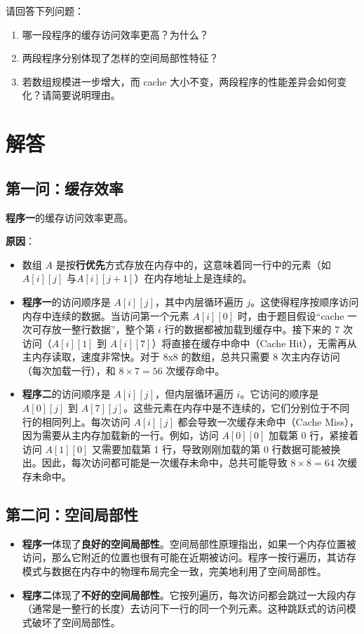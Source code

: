 请回答下列问题：
\begin{enumerate}
    \item 哪一段程序的缓存访问效率更高？为什么？
    \item 两段程序分别体现了怎样的空间局部性特征？
    \item 若数组规模进一步增大，而 cache 大小不变，两段程序的性能差异会如何变化？请简要说明理由。
\end{enumerate}

\section{解答}

\subsection{第一问：缓存效率}
\textbf{程序一}的缓存访问效率更高。

\textbf{原因}：
\begin{itemize}
    \item 数组 $A$ 是按\textbf{行优先}方式存放在内存中的，这意味着同一行中的元素（如 $A[i][j]$ 与$A[i][j+1]$）在内存地址上是连续的。
    \item \textbf{程序一}的访问顺序是 $A[i][j]$，其中内层循环遍历 $j$。这使得程序按顺序访问内存中连续的数据。当访问第一个元素 $A[i][0]$ 时，由于题目假设“cache 一次可存放一整行数据”，整个第 $i$ 行的数据都被加载到缓存中。接下来的 7 次访问（$A[i][1]$ 到 $A[i][7]$）将直接在缓存中命中（Cache Hit），无需再从主内存读取，速度非常快。对于 8x8 的数组，总共只需要 8 次主内存访问（每次加载一行），和 $8 \times 7 = 56$ 次缓存命中。
    \item \textbf{程序二}的访问顺序是 $A[i][j]$，但内层循环遍历 $i$。它访问的顺序是 $A[0][j]$ 到 $A[7][j]$。这些元素在内存中是不连续的，它们分别位于不同行的相同列上。每次访问 $A[i][j]$ 都会导致一次缓存未命中（Cache Miss），因为需要从主内存加载新的一行。例如，访问 $A[0][0]$ 加载第 0 行，紧接着访问 $A[1][0]$ 又需要加载第 1 行，导致刚刚加载的第 0 行数据可能被换出。因此，每次访问都可能是一次缓存未命中，总共可能导致 $8 \times 8 = 64$ 次缓存未命中。
\end{itemize}

\subsection{第二问：空间局部性}
\begin{itemize}
    \item \textbf{程序一}体现了\textbf{良好的空间局部性}。空间局部性原理指出，如果一个内存位置被访问，那么它附近的位置也很有可能在近期被访问。程序一按行遍历，其访存模式与数据在内存中的物理布局完全一致，完美地利用了空间局部性。
    \item \textbf{程序二}体现了\textbf{不好的空间局部性}。它按列遍历，每次访问都会跳过一大段内存（通常是一整行的长度）去访问下一行的同一个列元素。这种跳跃式的访问模式破坏了空间局部性。
\end{itemize}

